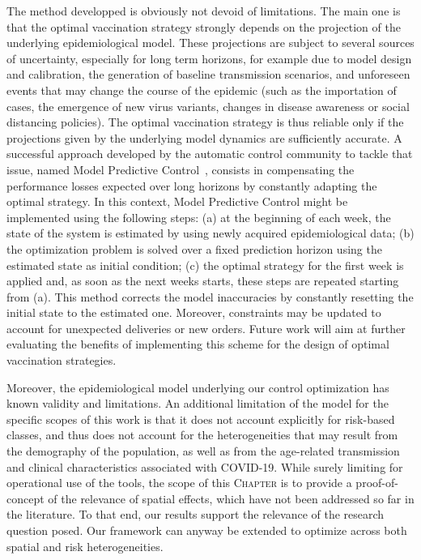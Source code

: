 The method developped is obviously not devoid of limitations. The main one is that the optimal vaccination strategy strongly depends on the projection of the underlying epidemiological model. These projections are subject to several sources of uncertainty, especially for long term horizons, for example due to model design and calibration\cite{Cramer:EvaluationIndividualEnsemble:2021}, the generation of baseline transmission scenarios, and unforeseen events that may change the course of the epidemic (such as the importation of cases, the emergence of new virus variants, changes in disease awareness or social distancing policies). The optimal vaccination strategy is thus reliable only if the projections given by the underlying model dynamics are sufficiently accurate. A successful approach developed by the automatic control community to tackle that issue, named Model Predictive Control~\cite{Rawlings:ModelPredictiveControl:2017}, consists in compensating the performance losses expected over long horizons by constantly adapting the optimal strategy. In this context, Model Predictive Control might be implemented using the following steps: (a) at the beginning of each week, the state of the system is estimated by using newly acquired epidemiological data; (b) the optimization problem is solved over a fixed prediction horizon using the estimated state as initial condition; (c) the optimal strategy for the first week is applied and, as soon as the next weeks starts, these steps are repeated starting from (a). This method corrects the model inaccuracies by constantly resetting the initial state to the estimated one. Moreover, constraints may be updated to account for unexpected deliveries or new orders. Future work will aim at further evaluating the benefits of implementing this scheme for the design of optimal vaccination strategies.

Moreover, the epidemiological model underlying our control optimization has known validity and limitations\cite[-3\baselineskip]{Gatto:SpreadDynamicsCOVID19:2020, Bertuzzo:GeographyCOVID19Spread:2020}. An additional limitation of the model for the specific scopes of this work is that it does not account explicitly for risk-based classes, and thus does not account for the heterogeneities that may result from the demography of the population, as well as from the age-related transmission and clinical characteristics associated with COVID-19. While surely limiting for operational use of the tools, the scope of this \textsc{Chapter} is to provide a proof-of-concept of the relevance of spatial effects, which have not been addressed so far in the literature. To that end, our results support the relevance of the research question posed. Our framework can anyway be extended to optimize across both spatial and risk heterogeneities. 

